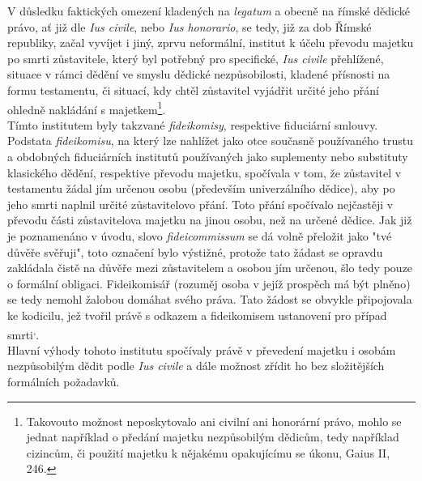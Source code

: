 \documentclass{article}
\begin{document}
V důsledku faktických omezení kladených na \textit{legatum} a obecně na římské dědické právo, ať již dle \textit{Ius civile}, nebo \textit{Ius honorario}, se tedy, již za dob Římské republiky, začal vyvíjet i jiný, zprvu neformální, institut k účelu převodu majetku po smrti zůstavitele, který byl potřebný pro specifické, \textit{Ius civile} přehlížené, situace v rámci dědění ve smyslu dědické nezpůsobilosti, kladené přísnosti na formu testamentu, či situací, kdy chtěl zůstavitel vyjádřit určité jeho přání ohledně nakládání s majetkem\footnote{Takovouto možnost neposkytovalo ani civilní ani honorární právo, mohlo se jednat například o předání majetku nezpůsobilým dědicům, tedy například cizincům, či použití majetku k nějakému opakujícímu se úkonu, Gaius II, 246.}.\\

 Tímto institutem byly takzvané \textit{fideikomisy}, respektive fiduciární smlouvy. Podstata \textit{fideikomisu}, na který lze nahlížet jako otce současně používaného trustu a obdobných fiduciárních institutů používaných jako suplementy nebo substituty klasického dědění, respektive převodu majetku, spočívala v tom, že zůstavitel v testamentu žádal jím určenou osobu (především univerzálního dědice), aby po jeho smrti naplnil určité zůstavitelovo přání. Toto přání spočívalo nejčastěji v převodu části zůstavitelova majetku na jinou osobu, než na určené dědice. Jak již je poznamenáno v úvodu, slovo \textit{fideicommissum} se dá volně přeložit jako "tvé důvěře svěřuji", toto označení bylo výstižné, protože tato žádast se opravdu zakládala čistě na důvěře mezi zůstavitelem a osobou jím určenou, šlo tedy pouze o formální obligaci. Fideikomisář (rozuměj osoba v jejíž prospěch má být plněno) se tedy nemohl žalobou domáhat svého práva. Tato žádost se obvykle připojovala ke kodicilu, jež tvořil právě s odkazem a fideikomisem ustanovení pro případ smrti\textsuperscript{,}. \\

Hlavní výhody tohoto institutu spočívaly právě v převedení majetku i oso\-bám nezpůsobilým dědit podle \textit{Ius civile} a dále možnost zřídit ho bez složitějších formálních požadavků.\\

\end{document}
